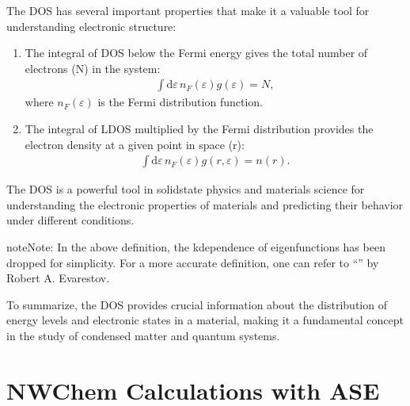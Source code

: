 \documentclass[letterpaper,10pt,english]{sphinxmanual}
\begin{document}
\sphinxAtStartPar
The DOS has several important properties that make it a valuable tool for understanding electronic structure:
\begin{enumerate}
%
\item {} 
\sphinxAtStartPar
{} The integral of DOS below the Fermi energy gives the total number of electrons (N) in the system:
\begin{equation*}
\begin{split}\int\!\mathrm{d}\varepsilon\, n_F(\varepsilon) g(\varepsilon) = N,\end{split}
\end{equation*}
\sphinxAtStartPar
where \(n_F(\varepsilon)\) is the Fermi distribution function.

\item {} 
\sphinxAtStartPar
{} The integral of LDOS multiplied by the Fermi distribution provides the electron density at a given point in space (r):
\begin{equation*}
\begin{split}\int\!\mathrm{d}\varepsilon\, n_F(\varepsilon) g(r, \varepsilon) = n(r).\end{split}
\end{equation*}
\end{enumerate}

\sphinxAtStartPar
The DOS is a powerful tool in solid\sphinxhyphen{}state physics and materials science for understanding the electronic properties of materials and predicting their behavior under different conditions.

\begin{sphinxadmonition}{note}{Note:}
\sphinxAtStartPar
In the above definition, the k\sphinxhyphen{}dependence of eigenfunctions has been dropped for simplicity. For a more accurate definition, one can refer to “” by Robert A. Evarestov.
\end{sphinxadmonition}

\sphinxAtStartPar
To summarize, the DOS provides crucial information about the distribution of energy levels and electronic states in a material, making it a fundamental concept in the study of condensed matter and quantum systems.

\sphinxstepscope


\chapter{NWChem Calculations with ASE}
\label{\detokenize{nwase/nwase:nwchem-calculations-with-ase}}\label{\detokenize{nwase/nwase::doc}}
\end{document}

